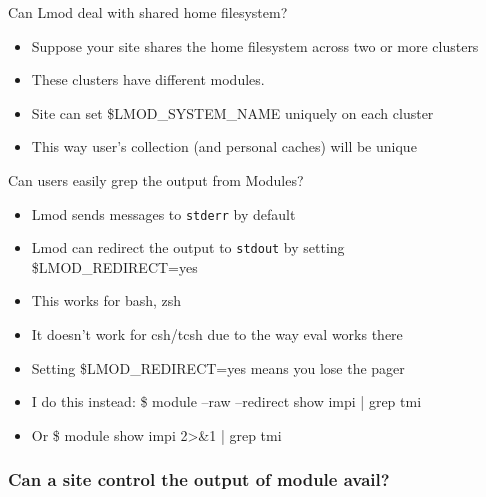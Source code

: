 \documentclass{beamer}
\begin{document}
\begin{frame}{Can Lmod deal with shared home filesystem?}
  \begin{itemize}
    \item Suppose your site shares the home filesystem across two or
      more clusters
    \item These clusters have different modules.
    \item Site can set \$LMOD\_SYSTEM\_NAME uniquely on each cluster
    \item This way user's collection (and personal caches) will be
      unique
  \end{itemize}
\end{frame}

\begin{frame}{Can users easily grep the output from Modules?}
  \begin{itemize}
    \item Lmod sends messages to \texttt{stderr} by default
    \item Lmod can redirect the output to \texttt{stdout} by setting
      \$LMOD\_REDIRECT=yes
    \item This works for bash, zsh
    \item It doesn't work for csh/tcsh due to the way eval works there
    \item Setting \$LMOD\_REDIRECT=yes means you lose the pager
    \item I do this instead: \$ module --raw --redirect show impi |
      grep tmi
    \item Or \$ module show impi 2>\&1 | grep tmi
  \end{itemize}
\end{frame}

\begin{frame}[fragile]
    \frametitle{Can a site control the output of module avail?}
  {\tiny
}
\end{frame}
\end{document}
